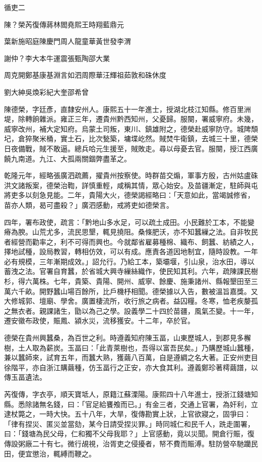 
\begin{pinyinscope}
循吏二

陳？榮芮復傳蔣林閻堯熙王時翔藍鼎元

葉新施昭庭陳慶門周人龍童華黃世發李渭

謝仲？李大本牛運震張甄陶邵大業

周克開鄭基康基淵言如泗周際華汪輝祖茹敦和硃休度

劉大紳吳煥彩紀大奎邵希曾

陳德榮，字廷彥，直隸安州人。康熙五十一年進士，授湖北枝江知縣。修百里洲堤，除轉餉雜派。雍正三年，遷貴州黔西知州，父憂歸。服闋，署威寧府。未幾，威寧改州，補大定知府。烏蒙土司叛，東川、鎮雄附之，德榮赴威寧防守。城陴頹圮，倉猝聚米桶，實土石，比次甃築，墉堞屹然。賊焚牛衛鎮，去城三十里，德榮日夜備戰，賊不敢逼。總兵哈元生援至，賊敗走。尋以母憂去官。服闋，授江西廣饒九南道。九江、大孤兩關錮弊盡革之。

乾隆元年，經略張廣泗疏薦，擢貴州按察使。時群苗交煽，軍事方殷，古州姑盧硃洪文諸叛案，德榮治鞫，詳慎重輕，咸稱其情，眾心始安。及苗疆漸定，駐師與屯將吏多以刻急見能。二年，貴陽大火，德榮謁經略曰：「天意如此，當竭誠修省，苗亦人類，曷可盡殺？」廣泗感動，戒將吏如德榮言。

四年，署布政使，疏言：「黔地山多水足，可以疏土成田。小民難於工本，不能變瘠為腴。山荒尤多，流民思墾，輒見撓阻。桑條肥沃，亦不知蠶繅之法。自非牧民者經營而勸率之，利不可得而興也。今就鄰省雇募種棉、織布、飼蠶、紡績之人，擇地試種，設局教習，轉相仿效，可以有成。應責各道因地制宜，隨時設教。一年必有規模，三年漸期成效。」詔允行。乃給工本，築壩堰，引山泉，治水田，導以蓄洩之法。官署自育蠶，於省城大興寺繅絲織作，使民知其利。六年，疏陳課民樹杉，得六萬株。七年，貴築、貴陽、開州、威寧、餘慶、施秉諸州、縣報墾田至三萬六千畝。開野蠶山場百餘所，比戶機杼相聞。德榮據以入告，數被溫旨嘉獎。又大修城郭、壇廟、學舍。廣置棲流所，收行旅之病者。益囚糧。冬寒，恤老疾嫠孤之無衣者。親課諸生，勖以為己之學。設義學二十四於苗疆，風氣丕變。十一年，遷安徽布政使，賑鳳、潁水災，流移獲安。十二年，卒於官。

德榮在貴州興蠶桑，為百世之利。時遵義知府陳玉畐，山東歷城人，到郡見多檞樹，土人取為薪炭。玉畐曰：「此青萊樹也，吾得以富吾民矣。」乃購歷城山蠶種，兼以蠶師來，試育五年，而蠶大熟，獲繭八百萬，自是遵綢之名大著。正安州吏目徐階平，亦自浙江購繭種，仿玉畐行之正安，亦大食其利。遵義鄭珍著樗繭譜，以傳玉畐遺法。

芮復傳，字衣亭，順天寶坻人，原籍江蘇溧陽。康熙四十八年進士，授浙江錢塘知縣。悉除諸無名錢，曰：「官足給饔飧而已。」有金三者，交通上官署，為奸利，立逮杖斃之，一時大快。五十八年，大旱，復傳勘實上狀，上官欲寢之，固爭曰：「律有捏災、匿災並當劾，某今日請受捏災罪。」時同城仁和民千人，跣走圍署，曰：「錢塘為民父母，仁和獨不父母我耶？」上官感動，竟以災聞。開倉行賑，復傳設粥廠二十有七。微行覘視，治胥吏之侵擾者，帑不費而賑溥。駐防營卒馳躪民田，便宜懲治，輒縛而鞭之。


\end{pinyinscope}
